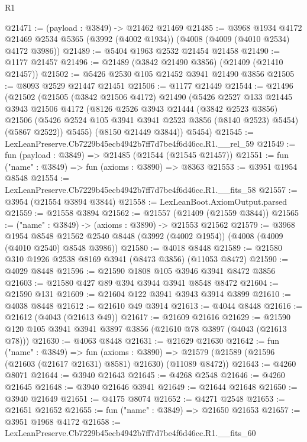\begin{lexlean}{R1}
\begin{coremodule}
@21471 := (payload : @3849) -> @21462 @21469
@21485 := @3968
    @1934
    @4172
    @21469
    @2534
    @5365
    (@3992 (@4002 @1934))
    (@4008 (@4009 (@4010 @2534) @4172 @3986))
@21489 := @5404 @1963 @2532 @21454 @21458
@21490 := @1177 @21457
@21496 := @21489 (@3842 @21490 @3856) (@21409 (@21410 @21457))
@21502 := @5426 @2530 @105 @21452 @3941 @21490 @3856
@21505 := @8093 @2529 @21447 @21451
@21506 := @1177 @21449
@21544 := @21496
    (@21502
      (@21505
        (@3842 @21506 @4172)
        @21490
        (@5426
          @2527
          @133
          @21445
          @3943
          @21506
          @4172
          (@8126
            @2526
            @3943
            @21444
            (@3842 @2523 @3856)
            @21506
            (@5426 @2524 @105 @3941 @3941 @2523 @3856 (@8140 @2523) @5454)
            (@5867 @2522))
          @5455)
        (@8150 @21449 @3844))
      @5454)
@21545 := LexLeanPreserve.Cb7229b45ecb4942b7ff7d7be4f6d46cc.R1.__rel_59
@21549 := fun (payload : @3849) => @21485 (@21544 (@21545 @21457))
@21551 := fun ("name" : @3849) => fun (axioms : @3890) => @8363
@21553 := @3951 @1954 @8548
@21554 := LexLeanPreserve.Cb7229b45ecb4942b7ff7d7be4f6d46cc.R1.__fits_58
@21557 := @3954 (@21554 @3894 @3844)
@21558 := LexLeanBoot.AxiomOutput.parsed
@21559 := @21558 @3894
@21562 := @21557 (@21409 (@21559 @3844))
@21565 := ("name" : @3849) -> (axioms : @3890) -> @21553 @21562
@21579 := @3968
    @1954
    @8548
    @21562
    @2540
    @8448
    (@3992 (@4002 @1954))
    (@4008 (@4009 (@4010 @2540) @8548 @3986))
@21580 := @4018 @8448
@21589 := @21580 @310 @1926 @2538 @8169 @3941 (@8473 @3856) (@11053 @8472)
@21590 := @4029 @8448
@21596 := @21590 @1808 @105 @3946 @3941 @8472 @3856
@21603 := @21580 @427 @89 @394 @3944 @3941 @8548 @8472
@21604 := @21590 @131
@21609 := @21604 @122 @3941 @3943 @3914 @3899
@21610 := @4038 @8448
@21612 := @21610 @49 @3914
@21613 := @4044 @8448
@21616 := @21612 (@4043 (@21613 @49))
@21617 := @21609 @21616
@21629 := @21590 @120 @105 @3941 @3941 @3897 @3856 (@21610 @78 @3897 (@4043 (@21613 @78)))
@21630 := @4063 @8448
@21631 := @21629 @21630
@21642 := fun ("name" : @3849) =>
  fun (axioms : @3890) =>
  @21579 (@21589 (@21596 (@21603 (@21617 @21631) @8581) @21630) (@11089 @8472))
@21643 := @4260 @8071
@21644 := @3940 @21643
@21645 := @4268 @2548
@21646 := @4260 @21645
@21648 := @3940 @21646 @3941
@21649 := @21644 @21648
@21650 := @3940 @21649
@21651 := @4175 @8074
@21652 := @4271 @2548
@21653 := @21651 @21652
@21655 := fun ("name" : @3849) => @21650 @21653
@21657 := @3951 @1968 @4172
@21658 := LexLeanPreserve.Cb7229b45ecb4942b7ff7d7be4f6d46cc.R1.__fits_60

\end{coremodule}
\end{lexlean}
